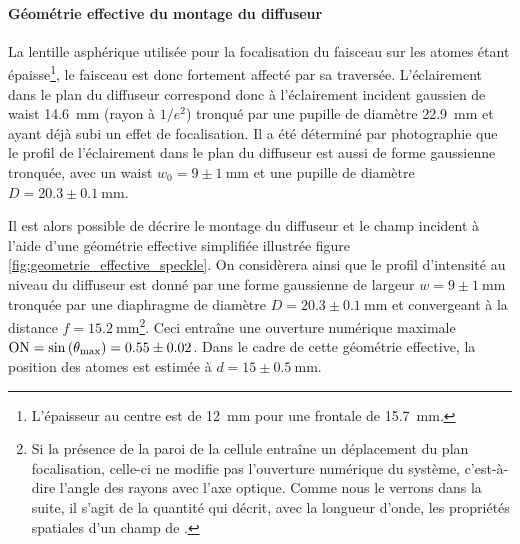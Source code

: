 \paragraph*{Géométrie effective du montage du diffuseur}
La lentille asphérique utilisée pour la focalisation du faisceau sur les atomes étant épaisse\footnote{L'épaisseur au centre est de \SI{12}{\milli\metre} pour une frontale de \SI{15.7}{\milli\metre}.}, le faisceau est donc fortement affecté par sa traversée. L'éclairement dans le plan du diffuseur correspond donc à l'éclairement incident gaussien de waist \SI{14.6}{\milli\metre} (rayon à $1/e^2$) tronqué par une pupille de diamètre \SI{22.9}{\milli\metre} et ayant déjà subi un effet de focalisation. Il a été déterminé par photographie que le profil de l'éclairement dans le plan du diffuseur est aussi de forme gaussienne tronquée, avec un waist $w_0=9\pm\SI{1}{\milli\metre}$ et une pupille de diamètre $D=20.3\pm\SI{0.1}{\milli\metre}$.

Il est alors possible de décrire le montage du diffuseur et le champ incident à l'aide d'une géométrie effective simplifiée illustrée figure \ref{fig:geometrie_effective_speckle}. On considèrera ainsi que le profil d'intensité au niveau du diffuseur est donné par une forme gaussienne de largeur $w=9\pm\SI{1}{\milli\metre}$ tronquée par une diaphragme de diamètre $D=20.3\pm\SI{0.1}{\milli\metre}$ et convergeant à la distance $f=\SI{15.2}{\milli\metre}$\footnote{Si la présence de la paroi de la cellule entraîne un déplacement du plan focalisation, celle-ci ne modifie pas l'ouverture numérique du système, c'est-à-dire l'angle des rayons avec l'axe optique. Comme nous le verrons dans la suite, il s'agit de la quantité qui décrit, avec la longueur d'onde, les propriétés spatiales d'un champ de \speckle .}. Ceci entraîne une ouverture numérique maximale $\mathrm{ON}=\sin{(\theta_{\mathrm{max}})}=0.55\pm0.02$. Dans le cadre de cette géométrie effective, la position des atomes est estimée à $d=15\pm\SI{0.5}{\milli\metre}$.

